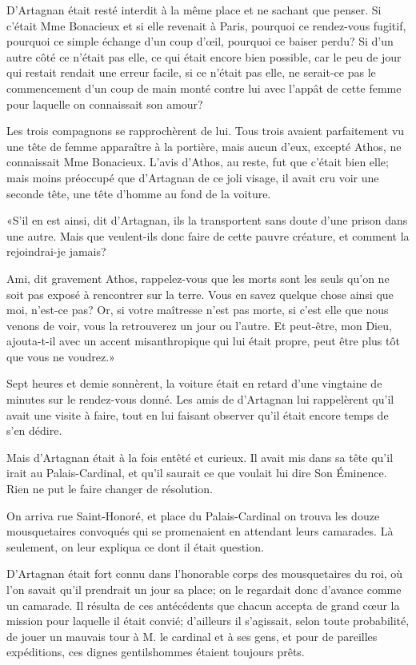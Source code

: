 D'Artagnan était resté interdit à la même place et ne sachant que penser. Si c'était Mme Bonacieux et si elle revenait à Paris, pourquoi ce rendez-vous fugitif, pourquoi ce simple échange d'un coup d'œil, pourquoi ce baiser perdu? Si d'un autre côté ce n'était pas elle, ce qui était encore bien possible, car le peu de jour qui restait rendait une erreur facile, si ce n'était pas elle, ne serait-ce pas le commencement d'un coup de main monté contre lui avec l'appât de cette femme pour laquelle on connaissait son amour? 

Les trois compagnons se rapprochèrent de lui. Tous trois avaient parfaitement vu une tête de femme apparaître à la portière, mais aucun d'eux, excepté Athos, ne connaissait Mme Bonacieux. L'avis d'Athos, au reste, fut que c'était bien elle; mais moins préoccupé que d'Artagnan de ce joli visage, il avait cru voir une seconde tête, une tête d'homme au fond de la voiture. 

«S'il en est ainsi, dit d'Artagnan, ils la transportent sans doute d'une prison dans une autre. Mais que veulent-ils donc faire de cette pauvre créature, et comment la rejoindrai-je jamais? 

\speak  Ami, dit gravement Athos, rappelez-vous que les morts sont les seuls qu'on ne soit pas exposé à rencontrer sur la terre. Vous en savez quelque chose ainsi que moi, n'est-ce pas? Or, si votre maîtresse n'est pas morte, si c'est elle que nous venons de voir, vous la retrouverez un jour ou l'autre. Et peut-être, mon Dieu, ajouta-t-il avec un accent misanthropique qui lui était propre, peut être plus tôt que vous ne voudrez.» 

Sept heures et demie sonnèrent, la voiture était en retard d'une vingtaine de minutes sur le rendez-vous donné. Les amis de d'Artagnan lui rappelèrent qu'il avait une visite à faire, tout en lui faisant observer qu'il était encore temps de s'en dédire. 

Mais d'Artagnan était à la fois entêté et curieux. Il avait mis dans sa tête qu'il irait au Palais-Cardinal, et qu'il saurait ce que voulait lui dire Son Éminence. Rien ne put le faire changer de résolution. 

On arriva rue Saint-Honoré, et place du Palais-Cardinal on trouva les douze mousquetaires convoqués qui se promenaient en attendant leurs camarades. Là seulement, on leur expliqua ce dont il était question. 

D'Artagnan était fort connu dans l'honorable corps des mousquetaires du roi, où l'on savait qu'il prendrait un jour sa place; on le regardait donc d'avance comme un camarade. Il résulta de ces antécédents que chacun accepta de grand cœur la mission pour laquelle il était convié; d'ailleurs il s'agissait, selon toute probabilité, de jouer un mauvais tour à M. le cardinal et à ses gens, et pour de pareilles expéditions, ces dignes gentilshommes étaient toujours prêts. 

